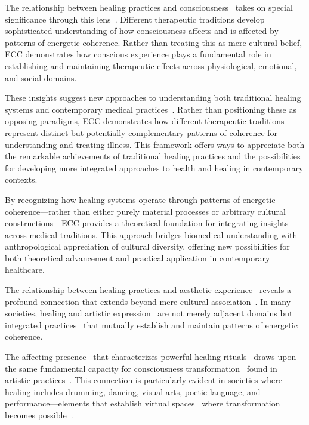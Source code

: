 The relationship between healing practices and consciousness~ takes on special significance through this lens~\cite{csordas1993somatic,thompson2001radical}. Different therapeutic traditions develop sophisticated understanding of how consciousness affects and is affected by patterns of energetic coherence. Rather than treating this as mere cultural belief, ECC demonstrates how conscious experience plays a fundamental role in establishing and maintaining therapeutic effects across physiological, emotional, and social domains.

These insights suggest new approaches to understanding both traditional healing systems and contemporary medical practices~\cite{kleinman1980patients,baer2001biomedicine}. Rather than positioning these as opposing paradigms, ECC demonstrates how different therapeutic traditions represent distinct but potentially complementary patterns of coherence for understanding and treating illness. This framework offers ways to appreciate both the remarkable achievements of traditional healing practices and the possibilities for developing more integrated approaches to health and healing in contemporary contexts.

By recognizing how healing systems operate through patterns of energetic coherence—rather than either purely material processes or arbitrary cultural constructions—ECC provides a theoretical foundation for integrating insights across medical traditions. This approach bridges biomedical understanding with anthropological appreciation of cultural diversity, offering new possibilities for both theoretical advancement and practical application in contemporary healthcare.

The relationship between healing practices and aesthetic experience~ reveals a profound connection that extends beyond mere cultural association~\cite{csordas1994sacred,gell1998art}. In many societies, healing and artistic expression~ are not merely adjacent domains but integrated practices~ that mutually establish and maintain patterns of energetic coherence.

The affecting presence~ that characterizes powerful healing rituals~ draws upon the same fundamental capacity for consciousness transformation~ found in artistic practices~\cite{armstrong1971affecting,kapferer2004ritual}. This connection is particularly evident in societies where healing includes drumming, dancing, visual arts, poetic language, and performance—elements that establish virtual spaces~ where transformation becomes possible~\cite{schechner1985between,desjarlais1992body}.

